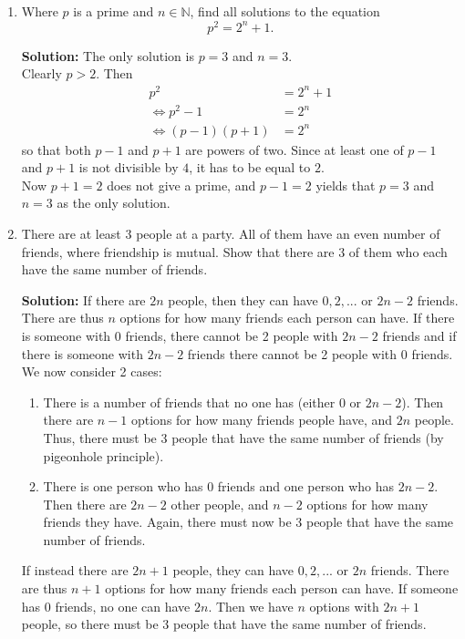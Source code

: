 \documentclass{article}
\begin{document}
\begin{enumerate}[itemsep=24pt]
\item %
Where $p$ is a prime and $n\in\mathbb{N}$, find all solutions to the equation \[p^2 = 2^n + 1.\]

\textbf{Solution:} The only solution is $p = 3$ and $n = 3$.
\\ Clearly $p>2$. Then 
\begin{align*}
	p^2 &= 2^n + 1
	\\ \iff p^2-1 &= 2^n
	\\ \iff (p-1)(p+1) &= 2^n
\end{align*}
so that both $p-1$ and $p+1$ are powers of two. Since at least one of $p-1$ and $p+1$ is not divisible by $4$, it has to be equal to $2$.
\\ Now $p+1 = 2$ does not give a prime, and $p-1 = 2$ yields that $p =3$ and $n=3$ as the only solution. 


\item
There are at least 3 people at a party. All of them have an even number of friends, where friendship is mutual. Show that there are 3 of them who each have the same number of friends.

\textbf{Solution:} If there are $2n$ people, then they can have $0,2,...$ or $2n-2$ friends. There are thus $n$ options for how many friends each person can have. If there is someone with 0 friends, there cannot be 2 people with $2n-2$ friends and if there is someone with $2n-2$ friends there cannot be 2 people with 0 friends. We now consider 2 cases:
\begin{enumerate}
\item There is a number of friends that no one has (either 0 or $2n-2$). Then there are $n-1$ options for how many friends people have, and $2n$ people. Thus, there must be 3 people that have the same number of friends (by pigeonhole principle).
\item There is one person who has 0 friends and one person who has $2n-2$. Then there are $2n-2$ other people, and $n-2$ options for how many friends they have. Again, there must now be 3 people that have the same number of friends.
\end{enumerate}
If instead there are $2n+1$ people, they can have $0,2,...$ or $2n$ friends. There are thus $n+1$ options for how many friends each person can have. If someone has 0 friends, no one can have $2n$. Then we have $n$ options with $2n+1$ people, so there must be 3 people that have the same number of friends.

\end{enumerate}
\end{document}
